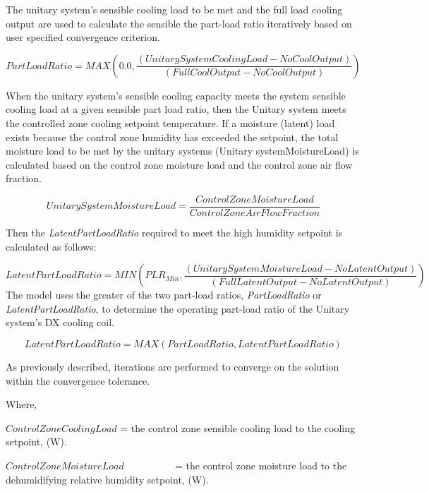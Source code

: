 The unitary system's sensible cooling load to be met and the full load cooling output are used to calculate the sensible the part-load ratio iteratively based on user specified convergence criterion.

\begin{equation}
PartLoadRatio = MAX\left( {0.0,\frac{{\left( {UnitarySystemCoolingLoad - NoCoolOutput} \right)}}{{\left( {FullCoolOutput - NoCoolOutput} \right)}}} \right)
\end{equation}

When the unitary system's sensible cooling capacity meets the system sensible cooling load at a given sensible part load ratio, then the Unitary system meets the controlled zone cooling setpoint temperature. If a moisture (latent) load exists because the control zone humidity has exceeded the setpoint, the total moisture load to be met by the unitary systems (Unitary systemMoistureLoad) is calculated based on the control zone moisture load and the control zone air flow fraction.

\begin{equation}
UnitarySystemMoistureLoad = \frac{{ControlZoneMoistureLoad}}{{ControlZoneAirFlowFraction}}
\end{equation}

Then the \emph{LatentPartLoadRatio} required to meet the high humidity setpoint is calculated as follows:

\[LatentPartLoadRatio = MIN\left( {PL{R_{Min}},\frac{{\left( {UnitarySystemMoistureLoad - NoLatentOutput} \right)}}{{\left( {FullLatentOutput - NoLatentOutput} \right)}}} \right)\] The model uses the greater of the two part-load ratios, \emph{PartLoadRatio} or \emph{LatentPartLoadRatio}, to determine the operating part-load ratio of the Unitary system's DX cooling coil.

\begin{equation}
LatentPartLoadRatio = MAX\left( {PartLoadRatio,LatentPartLoadRatio} \right)
\end{equation}

As previously described, iterations are performed to converge on the solution within the convergence tolerance.

Where,

\(ControlZoneCoolingLoad\) = the control zone sensible cooling load to the cooling setpoint, (W).

\(ControlZoneMoistureLoad\) ~~~~~~~~~ = the control zone moisture load to the dehumidifying relative humidity setpoint, (W).

